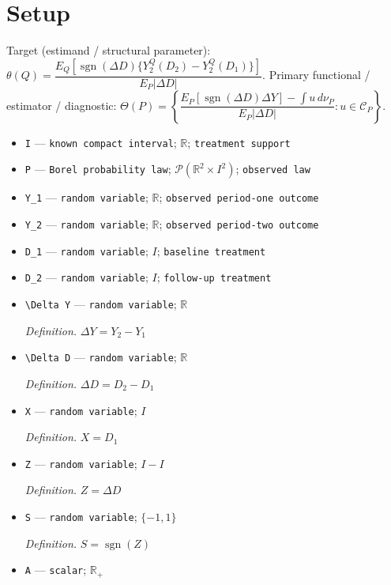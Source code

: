\documentclass{article}
\begin{document}
\section{Setup}

Target (estimand / structural parameter): \(\theta(Q)=\dfrac{E_Q[\operatorname{sgn}(\Delta D)\{Y_2^Q(D_2)-Y_2^Q(D_1)\}]}{E_P|\Delta D|}\).
Primary functional / estimator / diagnostic: \(\Theta(P)=\left\{\dfrac{E_P[\operatorname{sgn}(\Delta D)\Delta Y]-\int u\,d\nu_P}{E_P|\Delta D|}:u\in\mathcal C_P\right\}\).
\begin{itemize}
  \item \texttt{I} --- \texttt{known compact interval}; \(\mathbb R\); \texttt{treatment support}
  \item \texttt{P} --- \texttt{Borel probability law}; \(\mathcal P(\mathbb R^2\times I^2)\); \texttt{observed law}
  \item \texttt{Y\_\allowbreak{}1} --- \texttt{random variable}; \(\mathbb R\); \texttt{observed period-\allowbreak{}one outcome}
  \item \texttt{Y\_\allowbreak{}2} --- \texttt{random variable}; \(\mathbb R\); \texttt{observed period-\allowbreak{}two outcome}
  \item \texttt{D\_\allowbreak{}1} --- \texttt{random variable}; \(I\); \texttt{baseline treatment}
  \item \texttt{D\_\allowbreak{}2} --- \texttt{random variable}; \(I\); \texttt{follow-\allowbreak{}up treatment}
  \item \texttt{\textbackslash{}\allowbreak{}Delta Y} --- \texttt{random variable}; \(\mathbb R\)
  \par\smallskip\noindent\emph{Definition.} \(\Delta Y=Y_2-Y_1\)
  \item \texttt{\textbackslash{}\allowbreak{}Delta D} --- \texttt{random variable}; \(\mathbb R\)
  \par\smallskip\noindent\emph{Definition.} \(\Delta D=D_2-D_1\)
  \item \texttt{X} --- \texttt{random variable}; \(I\)
  \par\smallskip\noindent\emph{Definition.} \(X=D_1\)
  \item \texttt{Z} --- \texttt{random variable}; \(I-I\)
  \par\smallskip\noindent\emph{Definition.} \(Z=\Delta D\)
  \item \texttt{S} --- \texttt{random variable}; \(\{-1,1\}\)
  \par\smallskip\noindent\emph{Definition.} \(S=\operatorname{sgn}(Z)\)
  \item \texttt{A} --- \texttt{scalar}; \(\mathbb R_+\)

\end{itemize}
\end{document}
